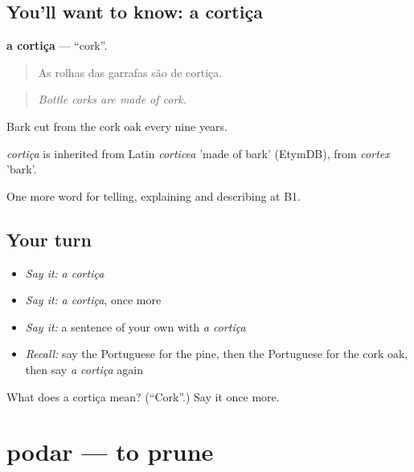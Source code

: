 \subsection*{You'll want to know: a cortiça}
\textbf{a cortiça} — \textquotedblleft{}cork\textquotedblright{}.

\begin{quote}
As rolhas das garrafas são de cortiça.
\end{quote}

\begin{quote}
\emph{Bottle corks are made of cork.}
\end{quote}

Bark cut from the cork oak every nine years.

\begin{cousinweb}
\emph{cortiça} is inherited from Latin \emph{corticea} 'made of bark' (EtymDB), from \emph{cortex} 'bark'.
\end{cousinweb}

\begin{grammarlens}[title={What you've built}]
One more word for telling, explaining and describing at B1.
\end{grammarlens}

\subsection*{Your turn}
\begin{itemize}
\raggedright
  \item \emph{Say it:} \emph{a cortiça}
  \item \emph{Say it:} \emph{a cortiça}, once more
  \item \emph{Say it:} a sentence of your own with \emph{a cortiça}
  \item \emph{Recall:} say the Portuguese for the pine, then the Portuguese for the cork oak, then say \emph{a cortiça} again
\end{itemize}

\begin{tcolorbox}[breakable,colback=teal!4,colframe=teal!35!black,title={Before you move on}]
What does a cortiça mean? (\textquotedblleft{}Cork\textquotedblright{}.) Say it once more.
\end{tcolorbox}
\section[podar]{podar — to prune}

\label{lesson:PT-C457-podar}



